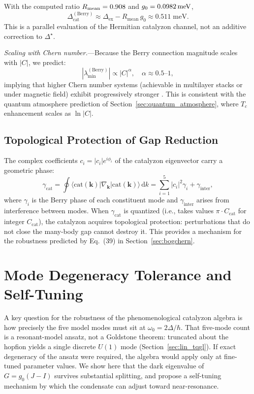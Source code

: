 \documentclass[11pt,letterpaper]{article}
\begin{document}
With the computed ratio $R_{\mathrm{mean}}=0.908$ and $g_0=0.0982\,\mathrm{meV}$,
\begin{equation}
\Delta_{\text{cat}}^{(\text{Berry})} \approx \Delta_{\text{ex}}-R_{\mathrm{mean}}\,g_0 \approx 0.511 \;\text{meV}.
\end{equation}
This is a parallel evaluation of the Hermitian catalyzon channel, not an additive correction to $\Delta^\star$.

\textit{Scaling with Chern number.}---Because the Berry connection magnitude scales with $|C|$, we predict:
\begin{equation}
|\lambda_{\min}^{(\text{Berry})}| \propto |C|^{\alpha}, \quad \alpha \approx 0.5\text{--}1,
\end{equation}
implying that higher Chern number systems (achievable in multilayer stacks or under magnetic field) exhibit progressively stronger \QVC{}. This is consistent with the quantum atmosphere prediction of Section~\ref{sec:quantum_atmosphere}, where $T_c$ enhancement scales as $\ln|C|$.

\subsection{Topological Protection of Gap Reduction}

The complex coefficients $c_i = |c_i| e^{i\phi_i}$ of the catalyzon eigenvector carry a geometric phase:
\begin{equation}
\gamma_{\text{cat}} = \oint \langle \text{cat}(\mathbf{k}) | \nabla_{\mathbf{k}} | \text{cat}(\mathbf{k}) \rangle \, \mathrm{d}k = \sum_{i=1}^5 |c_i|^2 \gamma_i + \gamma_{\text{inter}},
\end{equation}
where $\gamma_i$ is the Berry phase of each constituent mode and $\gamma_{\text{inter}}$ arises from interference between modes. When $\gamma_{\text{cat}}$ is quantized (i.e., takes values $\pi \cdot C_{\text{cat}}$ for integer $C_{\text{cat}}$), the catalyzon acquires topological protection: perturbations that do not close the many-body gap cannot destroy it. This provides a mechanism for the robustness predicted by Eq.~(39) in Section~\ref{sec:bogchern}.

\section{Mode Degeneracy Tolerance and Self-Tuning}
\label{sec:tolerance}

A key question for the robustness of the phenomenological catalyzon algebra is how precisely the five model modes must sit at $\omega_0 = 2\Delta/\hbar$. That five-mode count is a resonant-model ansatz, not a Goldstone theorem: truncated \TQGL{} about the hopfion yields a single discrete $U(1)$ mode (Section~\ref{sec:lin_tqgl}). If exact degeneracy of the ansatz were required, the algebra would apply only at fine-tuned parameter values. We show here that the dark eigenvalue of $G=g_0(J-I)$ survives substantial splitting, and propose a self-tuning mechanism by which the condensate can adjust toward near-resonance.
\end{document}
